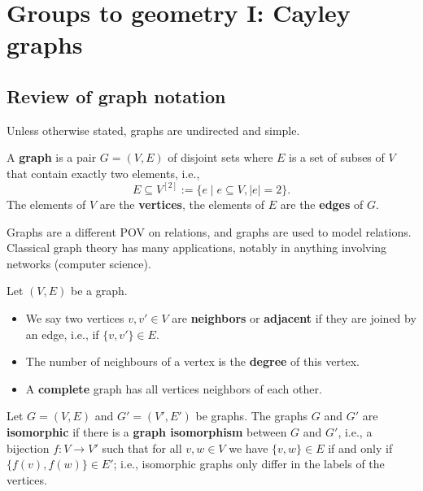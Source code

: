 \section{Groups to geometry I: Cayley graphs}

\subsection{Review of graph notation}
Unless otherwise stated, graphs are undirected and simple.
\begin{definition}[]
    A \textbf{graph} is a pair $G = \left( V,E \right) $ of disjoint sets where $E$ is a set of subses of $V$ that contain exactly two elements, i.e., \[
        E \subseteq V ^{[2]} := \{e \mid e \subseteq V, |e| =2 \} .
    \] The elements of $V$ are the \textbf{vertices}, the elements of $E$ are the \textbf{edges} of $G$.
\end{definition}
Graphs are a different POV on relations, and graphs are used to model relations. Classical graph theory has many applications, notably in anything involving networks (computer science).

\begin{definition}[]
    Let $(V,E)$ be a graph.
    \begin{itemize}
    \setlength\itemsep{-.2em}
        \item We say two vertices $v,v' \in V$ are \textbf{neighbors} or \textbf{adjacent} if they are joined by an edge, i.e., if $\{v, v' \} \in  E$.
        \item The number of neighbours of a vertex is the \textbf{degree} of this vertex.
        \item A \textbf{complete} graph has all vertices neighbors of each other.
    \end{itemize}
\end{definition}
\begin{definition}[]
    Let $G= (V,E)$ and $G'=(V',E')$ be graphs. The graphs $G$ and $G'$ are \textbf{isomorphic} if there is a \textbf{graph isomorphism} between $G$ and $ G'$, i.e.,  a bijection $f \colon V \to V'$ such that for all $v,w \in V$ we have $\{v,w \} \in E$ if and only if $\{f(v),f(w)\} \in E'$; i.e., isomorphic graphs only differ in the labels of the vertices.
\end{definition}

